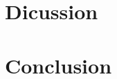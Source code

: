 \documentclass[10pt, a4paper, twocolumn]{article} %
\begin{document}
\section{Dicussion}\label{sec:discussion}
\section{Conclusion}

\printbibliography[title={Bibliography}] %

\end{document}
